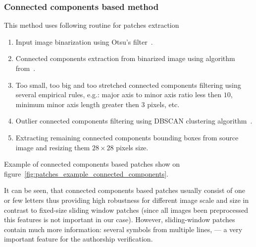 \documentclass[conference,a4paper,twocolumn]{IEEEtran}
\begin{document}
\subsubsection{Connected components based method}
This method uses following routine for patches extraction

\begin{enumerate}
	\item Input image binarization using Otsu's filter~\cite{otsu1975threshold}.
	\item Connected components extraction from binarized image using algorithm from~\cite{fiorio1996connected_components}.
	\item Too small, too big and too stretched connected components filtering using several empirical rules, e.g.: major axis to minor axis ratio less then $10$, minimum minor axis length greater then $3$ pixels, etc.
	\item Outlier connected components filtering using DBSCAN clustering algorithm~\cite{ester1996dbscan}.
	\item Extracting remaining connected components bounding boxes from source image and resizing them $28\times 28$ pixels size.
\end{enumerate}

Example of connected components based patches show on figure~\ref{fig:patches_example_connected_components}. 

It can be seen, that connected components based patches usually consist of one or few letters thus providing high robustness for different image scale and size in contrast to fixed-size sliding window patches (since all images been preprocessed this features is not important in our case). However, sliding-window patches contain much more information: several symbols from multiple lines, --- a very important feature for the authorship verification.
%

\end{document}
